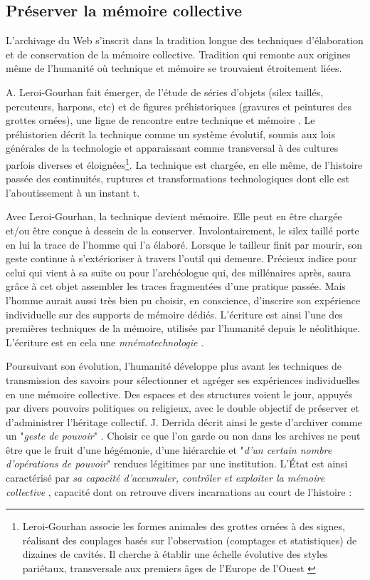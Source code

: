 \documentclass[symmetric,justified,marginals=raggedouter]{tufte-book}
\begin{document}
\subsection{Préserver la mémoire collective}

\noindent L'archivage du Web s'inscrit dans la tradition longue des techniques d'élaboration et de conservation de la mémoire collective. Tradition qui remonte aux origines même de l'humanité où technique et mémoire se trouvaient étroitement liées. 

A. Leroi-Gourhan fait émerger, de l'étude de séries d'objets (silex taillés, percuteurs, harpons, etc) et de figures préhistoriques (gravures et peintures des grottes ornées), une ligne de rencontre entre technique et mémoire \citep{leroi-gourhan_geste_1964}. Le préhistorien décrit la technique comme un système évolutif, soumis aux lois générales de la technologie et apparaissant comme transversal à des cultures parfois diverses et éloignées\footnote{
Leroi-Gourhan associe les formes animales des grottes ornées à des signes, réalisant des couplages basés sur l'observation (comptages et statistiques) de dizaines de cavités. Il cherche à établir une échelle évolutive des styles pariétaux, transversale aux premiers âges de l'Europe de l'Ouest \citep{leroi-gourham_art_1984}}. La technique est chargée, en elle même, de l'histoire passée des continuités, ruptures et transformations technologiques dont elle est l'aboutissement à un instant t.   

Avec Leroi-Gourhan, la technique devient mémoire. Elle peut en être chargée et/ou être conçue à dessein de la conserver. Involontairement, le silex taillé porte en lui la trace de l'homme qui l'a élaboré. Lorsque le tailleur finit par mourir, son geste continue à s'extérioriser à travers l'outil qui demeure. Précieux indice pour celui qui vient à sa suite ou pour l'archéologue qui, des millénaires après, saura grâce à cet objet assembler les traces fragmentées d'une pratique passée. Mais l'homme aurait aussi très bien pu choisir, en conscience, d'inscrire son expérience individuelle sur des supports de mémoire dédiés. L'écriture est ainsi l'une des premières techniques de la mémoire, utilisée par l'humanité depuis le néolithique. L'écriture est en cela une \textit{mnémotechnologie} \citep{stiegler_leroi-gourhan:_1998}. 

Poursuivant son évolution, l'humanité développe plus avant les techniques de transmission des savoirs pour sélectionner et agréger ses expériences individuelles en une mémoire collective. Des espaces et des structures voient le jour, appuyés par divers pouvoirs politiques ou religieux, avec le double objectif de préserver et d'administrer l'héritage collectif. J. Derrida décrit ainsi le geste d'archiver comme un "\textit{geste de pouvoir}" \citep[p.60]{derrida_trace_2014}. Choisir ce que l'on garde ou non dans les archives ne peut être que le fruit d'une hégémonie, d'une hiérarchie et "\textit{d'un certain nombre d'opérations de pouvoir}" rendues légitimes par une institution. L'État est ainsi caractérisé par \textit{sa capacité d'accumuler, contrôler et exploiter la mémoire collective} \citep{stiegler_etat_1991}, capacité dont on retrouve divers incarnations au court de l'histoire :
\end{document}
